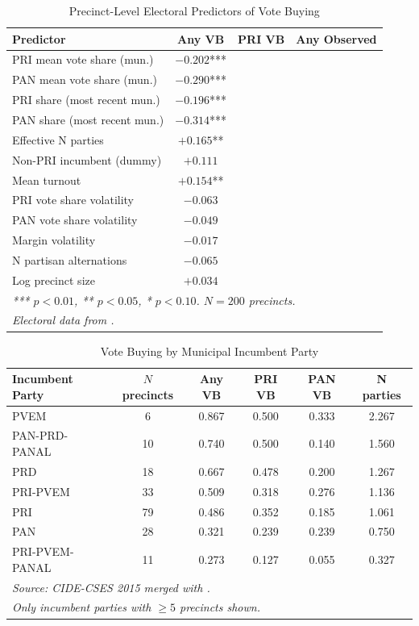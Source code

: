 \documentclass[12pt,letterpaper]{article}
\begin{document}
\begin{table}[H]
\centering
\caption{Precinct-Level Electoral Predictors of Vote Buying}
\label{tab:predictors}
\small
\begin{tabular}{lccc}
\toprule
Predictor & Any VB & PRI VB & Any Observed \\
\midrule
PRI mean vote share (mun.) & $-0.202$*** & & \\
PAN mean vote share (mun.) & $-0.290$*** & & \\
PRI share (most recent mun.) & $-0.196$*** & & \\
PAN share (most recent mun.) & $-0.314$*** & & \\
Effective N parties & $+0.165$** & & \\
Non-PRI incumbent (dummy) & $+0.111$ & & \\
Mean turnout & $+0.154$** & & \\
PRI vote share volatility & $-0.063$ & & \\
PAN vote share volatility & $-0.049$ & & \\
Margin volatility & $-0.017$ & & \\
N partisan alternations & $-0.065$ & & \\
Log precinct size & $+0.034$ & & \\
\bottomrule
\multicolumn{4}{l}{\textit{*** $p < 0.01$, ** $p < 0.05$, * $p < 0.10$. $N = 200$ precincts.}} \\
\multicolumn{4}{l}{\textit{Electoral data from \citet{larreguy2016parties}.}} \\
\end{tabular}
\end{table}

\begin{table}[H]
\centering
\caption{Vote Buying by Municipal Incumbent Party}
\label{tab:incumbent}
\small
\begin{tabular}{lccccc}
\toprule
Incumbent Party & $N$ precincts & Any VB & PRI VB & PAN VB & N parties \\
\midrule
PVEM & 6 & 0.867 & 0.500 & 0.333 & 2.267 \\
PAN-PRD-PANAL & 10 & 0.740 & 0.500 & 0.140 & 1.560 \\
PRD & 18 & 0.667 & 0.478 & 0.200 & 1.267 \\
PRI-PVEM & 33 & 0.509 & 0.318 & 0.276 & 1.136 \\
PRI & 79 & 0.486 & 0.352 & 0.185 & 1.061 \\
PAN & 28 & 0.321 & 0.239 & 0.239 & 0.750 \\
PRI-PVEM-PANAL & 11 & 0.273 & 0.127 & 0.055 & 0.327 \\
\bottomrule
\multicolumn{6}{l}{\textit{Source: CIDE-CSES 2015 merged with \citet{larreguy2016parties}.}} \\
\multicolumn{6}{l}{\textit{Only incumbent parties with $\geq 5$ precincts shown.}} \\
\end{tabular}
\end{table}
\end{document}
